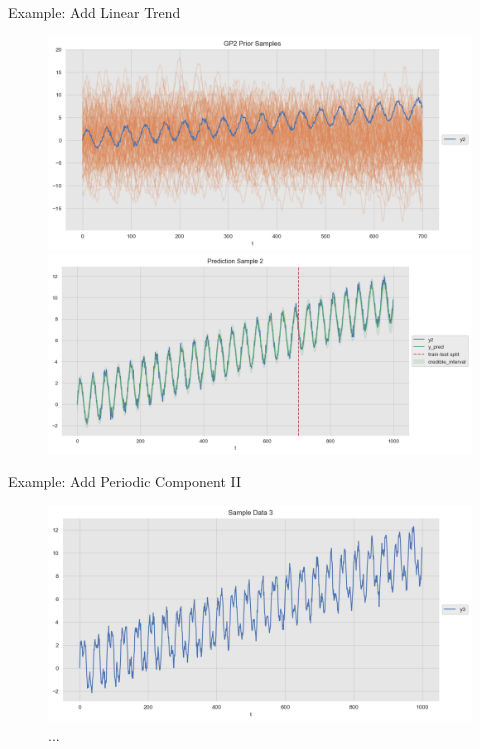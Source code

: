 \documentclass[10pt]{beamer}
\begin{document}
\begin{frame}{Example: Add Linear Trend }
\begin{center}
\begin{figure}
\includegraphics[scale=0.30]{images/gaussian_process_time_series_files/gaussian_process_time_series_44_0.png}
\includegraphics[scale=0.30]{images/gaussian_process_time_series_files/gaussian_process_time_series_49_0.png}
\end{figure}
\end{center}
\end{frame}

\begin{frame}{Example: Add Periodic Component II }
\begin{center}
\begin{figure}
\includegraphics[scale=0.4]{images/gaussian_process_time_series_files/gaussian_process_time_series_56_0.png} 
\caption{ ...  }
\end{figure}
\end{center}
\end{frame}
\end{document}
